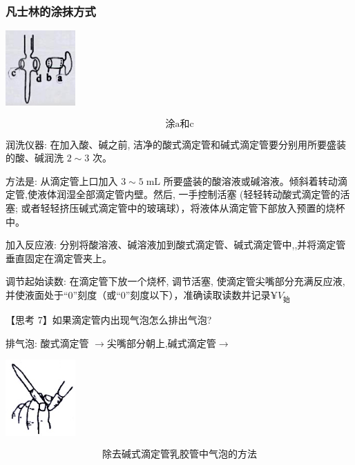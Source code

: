 \documentclass[10pt,cn]{elegantbook}
\begin{document}
	
	\subsubsection{凡士林的涂抹方式}
	
	\begin{center}
		\includegraphics[max width=0.2\textwidth]{image/c3-1.jpg}
	\end{center}
	
		\[\mbox{涂a和c}\]
	
	
	润洗仪器: 在加入酸、碱之前, 洁净的酸式滴定管和碱式滴定管要分别用所要盛装的酸、碱润洗 \(2 \sim 3\) 次。
	
	方法是: 从滴定管上口加入 \(3 \sim 5\mathrm{\;{mL}}\) 所要盛装的酸溶液或碱溶液。倾斜着转动滴定管,使液体润湿全部滴定管内壁。然后, 一手控制活塞 (轻轻转动酸式滴定管的活塞; 或者轻轻挤压碱式滴定管中的玻璃球），将液体从滴定管下部放入预置的烧杯中。
	
	加入反应液: 分别将酸溶液、碱溶液加到酸式滴定管、碱式滴定管中,,并将滴定管垂直固定在滴定管夹上。
	
	
	调节起始读数: 在滴定管下放一个烧杯, 调节活塞, 使滴定管尖嘴部分充满反应液, 并使液面处于“0”刻度（或“0”刻度以下），准确读取读数并记录$¥V_{\mbox{始}}$
	
	【思考 7】如果滴定管内出现气泡怎么排出气泡? 
	
	排气泡: 酸式滴定管 \(\rightarrow\)尖嘴部分朝上,碱式滴定管\(\rightarrow\)
	
	\begin{center}
		\includegraphics[max width=0.2\textwidth]{image/c4-1.jpg}
	\end{center}
		\[\mbox{除去碱式滴定管乳胶管中气泡的方法}\]
	
\end{document}
